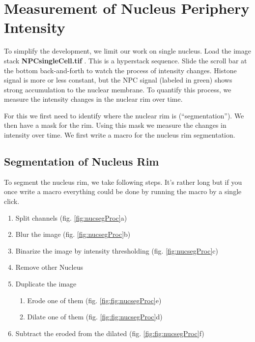 \section{Measurement of Nucleus Periphery Intensity}

To simplify the development, we limit our work on single nucleus. Load the image stack \textbf{NPCsingleCell.tif} . This is a hyperstack sequence. Slide the scroll bar at the bottom back-and-forth to watch the process of intensity changes. Histone signal is more or less constant, but the NPC signal (labeled in green) shows strong accumulation to the nuclear membrane. To quantify this process, we measure the intensity changes in the nuclear rim over time.

For this we first need to identify where the nuclear rim is (``segmentation''). We then have a mask for the rim. Using this mask we measure the changes in intensity over time. We first write a macro for the nucleus rim segmentation.

\subsection{Segmentation of Nucleus Rim}

To segment the nucleus rim, we take following steps. It's rather long but if you once write a macro everything could be done by running the macro by a single click.

\begin{enumerate}
  \item Split channels (fig. \ref{fig:nucsegProc}a)
  \item Blur the image (fig. \ref{fig:nucsegProc}b)
  \item Binarize the image by intensity thresholding (fig. \ref{fig:nucsegProc}c)
  \item Remove other Nucleus
  \item Duplicate the image
  \begin{enumerate}
    \item Erode one of them (fig. \ref{fig:fig:nucsegProc}e)
    \item Dilate one of them (fig. \ref{fig:fig:nucsegProc}d)
  \end{enumerate}
  \item Subtract the eroded from the dilated (fig. \ref{fig:fig:nucsegProc}f)
\end{enumerate}